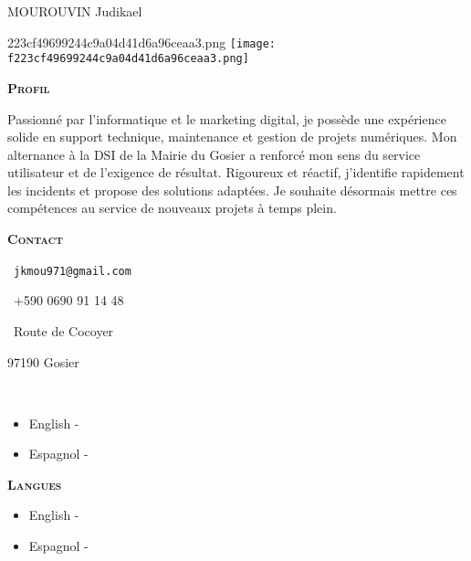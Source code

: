 \documentclass[11pt,a4paper]{article}
\newcommand{\headleft}[1]{\vspace*{3ex}\textsc{\textbf{#1}}\par%
  \vspace*{-1.5ex}\hrulefill\par\vspace*{0.7ex}}
\begin{document}
\thispagestyle{empty}
\setlength{\topskip}{0pt}\setlength{\parindent}{0pt}\setlength{\parskip}{0pt}
\raggedbottom

\begin{minipage}[t]{0.33\textwidth}
  \colorbox{cvblue}{\begin{minipage}[t][5mm][t]{\textwidth}\null\end{minipage}}
  \vspace{-.2ex}
  \colorbox{cvblue!90}{%
    \color{white}\textwidth
    \begin{minipage}[t][293mm][t]{0.82\textwidth}\raggedright
      \vspace*{2.5ex}
      \Large MOUROUVIN Judikael\normalsize

      \ifx\relaxf223cf49699244c9a04d41d6a96ceaa3.png\relax\else
        \vspace{2ex}\null\hfill
        \texttt{[image: f223cf49699244c9a04d41d6a96ceaa3.png]}
        \hfill\null
      \fi

      \headleft{Profil}
      \begingroup           %
        Passionné par l’informatique et le marketing digital, je possède une expérience solide en support technique, maintenance et gestion de projets numériques. Mon alternance à la DSI de la Mairie du Gosier a renforcé mon sens du service utilisateur et de l’exigence de résultat. Rigoureux et réactif, j’identifie rapidement les incidents et propose des solutions adaptées. Je souhaite désormais mettre ces compétences au service de nouveaux projets à temps plein.
      \endgroup             %

      \headleft{Contact}\small
      \MVAt\  \texttt{jkmou971@gmail.com}\par
      \Mobilefone\ +590 0690 91 14 48\par
      \Letter\ Route de Cocoyer\par
      97190 Gosier\par
      \faLinkedin\  \href{}{}
      \normalsize

      \ifx\relax\begin{itemize}[leftmargin=*]
\item English - \textcolor{gray}{}
\item Espagnol - \textcolor{gray}{}\end{itemize}\relax\else
        \headleft{Langues}
        \begin{itemize}[leftmargin=*]
\item English - \textcolor{gray}{}
\item Espagnol - \textcolor{gray}{}\end{itemize}
      \fi


\end{minipage}}
\end{minipage}
\end{document}
